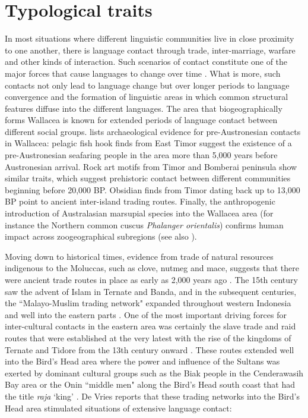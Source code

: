 \section{Typological traits}\label{sec:typo}
In most situations where different linguistic communities live in close proximity to one another, there is language contact through trade, inter-marriage, warfare and other kinds of interaction. Such scenarios of contact constitute one of the major forces that cause languages to change over time \citep{thomason2001language}. What is more, such contacts not only lead to language change but over longer periods to language convergence and the formation of linguistic areas in which common structural features diffuse into the different languages. The area that biogeographically forms Wallacea is known for extended periods of language contact between different social groups. \citet[141f.]{schapper2015wallacea} lists archaeological evidence for pre-Austronesian contacts in Wallacea: pelagic fish hook finds from East Timor suggest the existence of a pre-Austronesian seafaring people in the area more than 5,000 years before Austronesian arrival. Rock art motifs from Timor and Bomberai peninsula show similar traits, which suggest prehistoric contact between different communities beginning before 20,000 BP. Obsidian finds from Timor dating back up to 13,000 BP point to ancient inter-island trading routes. Finally, the anthropogenic introduction of Australasian marsupial species into the Wallacea area (for instance the Northern common cuscus \textit{Phalanger orientalis}) confirms human impact across zoogeographical subregions (see also \citealt{Heinsohn2010}).

Moving down to historical times, evidence from trade of natural resources indigenous to the Moluccas, such as clove, nutmeg and mace, suggests that there were ancient trade routes in place as early as 2,000 years ago \citep{klamer2008east}. The 15th century saw the advent of Islam in Ternate and Banda, and in the subsequent centuries, the ``Malayo-Muslim trading network" expanded throughout western Indonesia and well into the eastern parts \citep{klamer2008east}. One of the most important driving forces for inter-cultural contacts in the eastern area was certainly the slave trade and raid routes that were established at the very latest with the rise of the kingdoms of Ternate and Tidore from the 13th century onward \citep{klamer2008east}. These routes extended well into the Bird's Head area where the power and influence of the Sultans was exerted by dominant cultural groups such as the Biak people in the Cenderawasih Bay area \citep[2]{vanheuvel2006} or the Onin ``middle men" along the Bird's Head south coast that had the title \textit{raja} `king' \citep[2]{devries2004}. De Vries reports that these trading networks into the Bird's Head area stimulated situations of extensive language contact:

